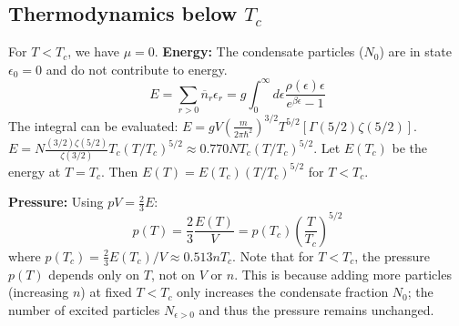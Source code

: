 \documentclass[11pt]{article}
\newcommand{\eps}{\epsilon}
\newcommand{\nbar}{\overline{n}} %
\begin{document}
\begin{center}
\end{center}

\subsection*{Thermodynamics below $T_c$}

For $T < T_c$, we have $\mu=0$.
\textbf{Energy:} The condensate particles ($N_0$) are in state $\eps_0=0$ and do not contribute to energy.
\[ E = \sum_{r>0} \nbar_r \eps_r = g \int_0^\infty d\eps \frac{\rho(\eps) \eps}{e^{\beta\eps} - 1} \]
The integral can be evaluated: $E = g V (\frac{m}{2\pi\hbar^2})^{3/2} T^{5/2} [\Gamma(5/2)\zeta(5/2)]$.
$E = N \frac{(3/2)\zeta(5/2)}{\zeta(3/2)} T_c (T/T_c)^{5/2} \approx 0.770 N T_c (T/T_c)^{5/2}$.
Let $E(T_c)$ be the energy at $T=T_c$. Then $E(T) = E(T_c) (T/T_c)^{5/2}$ for $T < T_c$.

\textbf{Pressure:} Using $pV = \frac{2}{3}E$:
\[ p(T) = \frac{2}{3} \frac{E(T)}{V} = p(T_c) \left( \frac{T}{T_c} \right)^{5/2} \]
where $p(T_c) = \frac{2}{3} E(T_c)/V \approx 0.513 n T_c$.
Note that for $T < T_c$, the pressure $p(T)$ depends only on $T$, not on $V$ or $n$. This is because adding more particles (increasing $n$) at fixed $T < T_c$ only increases the condensate fraction $N_0$; the number of excited particles $N_{\eps>0}$ and thus the pressure remains unchanged.

\begin{center}
\end{center}
\end{document}
